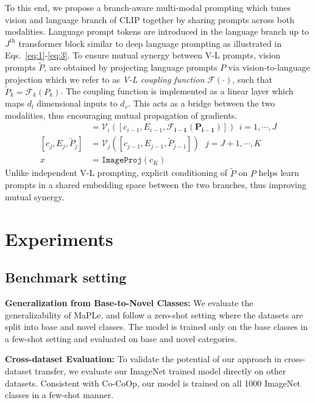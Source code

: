 \documentclass[10pt,twocolumn,letterpaper]{article}
\begin{document}
To this end, we propose a branch-aware multi-modal prompting which tunes vision and language branch of CLIP together by sharing prompts across both modalities. Language prompt tokens are introduced in the language branch up to $J^{\text{th}}$ transformer block similar to deep language prompting as illustrated in Eqs.~\ref{eq:1}-\ref{eq:3}. To ensure mutual synergy between V-L prompts, vision prompts $\tilde{P}$, are obtained by projecting language prompts $P$ via vision-to-language projection which we refer to as \textit{V-L coupling function} $\mathcal{F(\cdot)}$, such that $\tilde{P}_k= {\mathcal{F}_k(P_k)}$. The coupling function is implemented as a linear layer which maps $d_l$ dimensional inputs to $d_v$. This acts as a bridge between the two modalities, thus encouraging mutual propagation of gradients.
\begin{align*}
[c_i, E_i, \ \underline{\hspace{0.3cm}} \ ] &= \mathcal{V}_{i}([c_{i-1}, E_{i-1},\boldsymbol{\mathcal{F}_{i-1}(P_{i-1})}])  \ ~ i=1, \cdots, J \\
[c_j, E_j, \tilde{P}_{j}] &= \mathcal{V}_{j}([c_{j-1}, E_{j-1}, \tilde{P}_{j-1}])  \ \ ~  j=J+1, \cdots, K\\
x &= \texttt{ImageProj}({c}_K)
\end{align*}
Unlike independent V-L prompting, explicit conditioning of $\tilde{P}$ on $P$ helps learn prompts in a shared embedding space between the two branches, thus improving mutual synergy. 

\section{Experiments}
\subsection{Benchmark setting}

\noindent \textbf{Generalization from Base-to-Novel Classes:} We evaluate the generalizability of MaPLe, and follow a zero-shot setting where the datasets are split into base and novel classes. The model is trained only on the base classes in a few-shot setting and evaluated on base and novel categories.

\noindent  \textbf{Cross-dataset Evaluation:} To validate the potential of our approach in cross-dataset transfer, we evaluate  our ImageNet trained model directly on other datasets. Consistent with Co-CoOp, our model is trained on all 1000 ImageNet classes in a few-shot manner.
\end{document}
